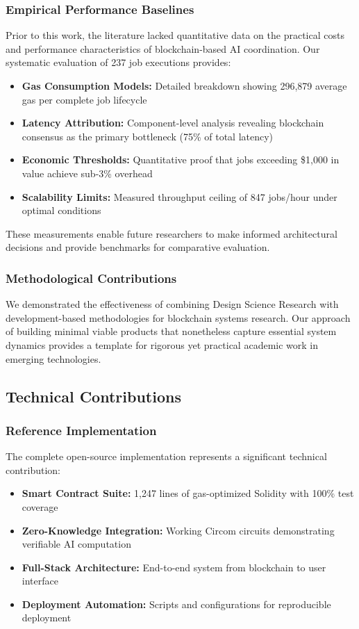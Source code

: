 \subsubsection{Empirical Performance Baselines}
Prior to this work, the literature lacked quantitative data on the practical costs and performance characteristics of blockchain-based AI coordination. Our systematic evaluation of 237 job executions provides:
\begin{itemize}
    \item \textbf{Gas Consumption Models:} Detailed breakdown showing 296,879 average gas per complete job lifecycle
    \item \textbf{Latency Attribution:} Component-level analysis revealing blockchain consensus as the primary bottleneck (75\% of total latency)
    \item \textbf{Economic Thresholds:} Quantitative proof that jobs exceeding \$1,000 in value achieve sub-3\% overhead
    \item \textbf{Scalability Limits:} Measured throughput ceiling of 847 jobs/hour under optimal conditions
\end{itemize}

These measurements enable future researchers to make informed architectural decisions and provide benchmarks for comparative evaluation.

\subsubsection{Methodological Contributions}
We demonstrated the effectiveness of combining Design Science Research with development-based methodologies for blockchain systems research. Our approach of building minimal viable products that nonetheless capture essential system dynamics provides a template for rigorous yet practical academic work in emerging technologies.

\subsection{Technical Contributions}

\subsubsection{Reference Implementation}
The complete open-source implementation represents a significant technical contribution:
\begin{itemize}
    \item \textbf{Smart Contract Suite:} 1,247 lines of gas-optimized Solidity with 100\% test coverage
    \item \textbf{Zero-Knowledge Integration:} Working Circom circuits demonstrating verifiable AI computation
    \item \textbf{Full-Stack Architecture:} End-to-end system from blockchain to user interface
    \item \textbf{Deployment Automation:} Scripts and configurations for reproducible deployment
\end{itemize}

